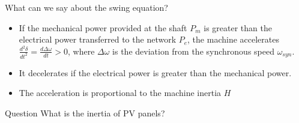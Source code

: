 \begin{frame}{What can we say about the swing equation?}
\begin{itemize}
    \item If the mechanical power provided at the shaft $P_m$ is greater than the electrical power transferred to the network $P_e$, the machine accelerates $\frac{d^2\delta}{dt^2} = \frac{d\Delta\omega}{dt} > 0$, where $\Delta\omega$ is the deviation from the synchronous speed $\omega_{syn}$.
    \item It decelerates if the electrical power is greater than the mechanical power.
    \item The acceleration is proportional to the machine inertia $H$
\end{itemize}
\begin{block}{Question}
    {What is the inertia of PV panels?}
\end{block}
\end{frame}



